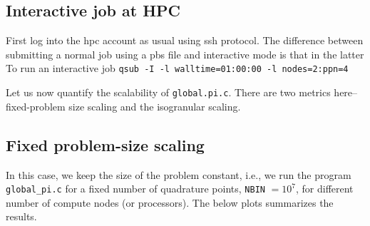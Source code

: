 \documentclass[11pt, oneside]{article}   	%
\begin{document}
\subsection{Interactive job at HPC}
First log into the hpc account as usual using ssh protocol. The difference between submitting a normal job using a pbs file and interactive mode is that in the latter 
To run an interactive job \texttt{qsub -I -l walltime=01:00:00 -l nodes=2:ppn=4}

Let us now quantify the scalability of \texttt{global.pi.c}. There are two metrics here-- fixed-problem size scaling and the isogranular scaling.

\subsection{Fixed problem-size scaling}
In this case, we keep the size of the problem constant, i.e., we run the program \texttt{global\_pi.c} for a fixed number of quadrature points, \texttt{NBIN} $= 10^7$, for different number of compute nodes (or processors). The below plots summarizes the results.
\end{document}
